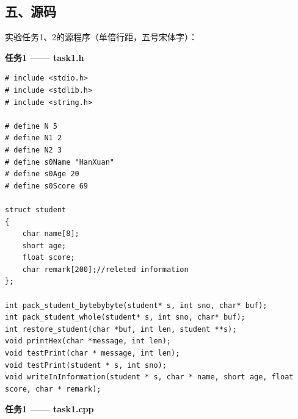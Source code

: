 \documentclass[12pt,a4paper]{ctexart}
\begin{document}
\subsection*{五、源码}

{\songti 实验任务1、2的源程序（单倍行距，五号宋体字）：}

\vspace{0.3cm}
\textbf{任务1 —— task1.h}

\begin{lstlisting}[basicstyle=\ttfamily\zihao{5},lineskip=-1pt]
# include <stdio.h>
# include <stdlib.h>
# include <string.h>

# define N 5
# define N1 2
# define N2 3
# define s0Name "HanXuan"
# define s0Age 20
# define s0Score 69

struct student
{
    char name[8];
    short age;
    float score;
    char remark[200];//releted information
};

int pack_student_bytebybyte(student* s, int sno, char* buf);
int pack_student_whole(student* s, int sno, char* buf);
int restore_student(char *buf, int len, student **s);
void printHex(char *message, int len);
void testPrint(char * message, int len);
void testPrint(student * s, int sno);
void writeInInformation(student * s, char * name, short age, float score, char * remark);
\end{lstlisting}

\vspace{0.3cm}
\textbf{任务1 —— task1.cpp}
\end{document}
